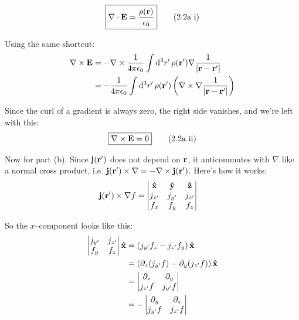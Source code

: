 \documentclass{article}
\begin{document}
\begin{equation}
	\boxed{\nabla\cdot\vb{E} = \frac{\rho(\vb{r})}{\epsilon _0}}\tag{2.2a i}\label{eq:2.2a1}
\end{equation}


Using the same shortcut:
\[
\begin{aligned}
	\nabla\times\vb{E} &= -\nabla\times\frac{1}{4\pi\epsilon _0}\int\dd[3]{r'}\rho(\vb{r'})\nabla \frac{1}{\left|\vb{r}-\vb{r'}\right|} \\
	&= -\frac{1}{4\pi\epsilon _0}\int\dd[3]{r'}\rho(\vb{r'})\left(\nabla\times\nabla \frac{1}{\left|\vb{r}-\vb{r'}\right|}\right)
\end{aligned}
\]


Since the curl of a gradient is always zero, the right side vanishes, and we're left with this:
\begin{equation}
	\boxed{\nabla\times\vb{E} = 0}\tag{2.2a ii}\label{eq:2.2a2}
\end{equation}

Now for part (b). Since $\vb{j}(\vb{r'})$ does not depend on $\vb{r}$, it anticommutes with $\nabla$ like a normal cross product, i.e. $\vb{j}(\vb{r'})\times\nabla = -\nabla\times\vb{j}(\vb{r'})$. Here's how it works:
\[
\begin{aligned}
	\vb{j}(\vb{r'})\times\nabla f &=
	\begin{vmatrix*}[c]
	\vu{x} & \vu{y} & \vu{z} \\
	j_{x'} & j_{y'} & j_{z'} \\
	f_x & f_y & f_z
	\end{vmatrix*}
\end{aligned}
\]

So the $x$--component looks like this:
\[
\begin{aligned}
	\begin{vmatrix*}[c]
	j_{y'} & j_{z'} \\
	f_y & f_z \\
	\end{vmatrix*}
	\vu{x} &= \left(j_{y'}f_z - j_{z'}f_y\right)\vu{x} \\
	&= \left(\partial_z(j_{y'}f) - \partial_y(j_{z'}f)\right)\vu{x} \\
	&=
	\begin{vmatrix*}[c]
	\partial_z & \partial_y \\
	j_{z'}f & j_{y'}f \\
	\end{vmatrix*} \\
	&= -
	\begin{vmatrix*}[c]
	\partial_y & \partial_z \\
	j_{y'}f & j_{z'}f \\
	\end{vmatrix*} \\
\end{aligned}
\]
\end{document}

